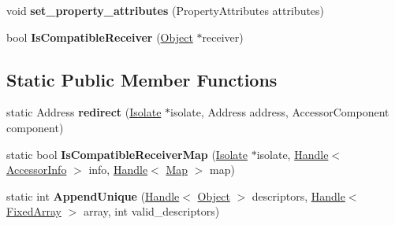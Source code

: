 \begin{DoxyCompactItemize}
\item 
void {\bfseries set\+\_\+property\+\_\+attributes} (Property\+Attributes attributes)\hypertarget{classv8_1_1internal_1_1_accessor_info_ad7d09993c5975f13a58aced7e1b482eb}{}\label{classv8_1_1internal_1_1_accessor_info_ad7d09993c5975f13a58aced7e1b482eb}

\item 
bool {\bfseries Is\+Compatible\+Receiver} (\hyperlink{classv8_1_1internal_1_1_object}{Object} $\ast$receiver)\hypertarget{classv8_1_1internal_1_1_accessor_info_af90ccc9b509016f749a5d69a29cebdf4}{}\label{classv8_1_1internal_1_1_accessor_info_af90ccc9b509016f749a5d69a29cebdf4}

\end{DoxyCompactItemize}
\subsection*{Static Public Member Functions}
\begin{DoxyCompactItemize}
\item 
static Address {\bfseries redirect} (\hyperlink{classv8_1_1internal_1_1_isolate}{Isolate} $\ast$isolate, Address address, Accessor\+Component component)\hypertarget{classv8_1_1internal_1_1_accessor_info_a5c296b2f2826fd5c775bda98dbb04989}{}\label{classv8_1_1internal_1_1_accessor_info_a5c296b2f2826fd5c775bda98dbb04989}

\item 
static bool {\bfseries Is\+Compatible\+Receiver\+Map} (\hyperlink{classv8_1_1internal_1_1_isolate}{Isolate} $\ast$isolate, \hyperlink{classv8_1_1internal_1_1_handle}{Handle}$<$ \hyperlink{classv8_1_1internal_1_1_accessor_info}{Accessor\+Info} $>$ info, \hyperlink{classv8_1_1internal_1_1_handle}{Handle}$<$ \hyperlink{classv8_1_1internal_1_1_map}{Map} $>$ map)\hypertarget{classv8_1_1internal_1_1_accessor_info_a2fe16a7c65b85aac347446457999fc51}{}\label{classv8_1_1internal_1_1_accessor_info_a2fe16a7c65b85aac347446457999fc51}

\item 
static int {\bfseries Append\+Unique} (\hyperlink{classv8_1_1internal_1_1_handle}{Handle}$<$ \hyperlink{classv8_1_1internal_1_1_object}{Object} $>$ descriptors, \hyperlink{classv8_1_1internal_1_1_handle}{Handle}$<$ \hyperlink{classv8_1_1internal_1_1_fixed_array}{Fixed\+Array} $>$ array, int valid\+\_\+descriptors)\hypertarget{classv8_1_1internal_1_1_accessor_info_a10dfefe3dc1780c1ca553aec96177b1b}{}\label{classv8_1_1internal_1_1_accessor_info_a10dfefe3dc1780c1ca553aec96177b1b}

\end{DoxyCompactItemize}
